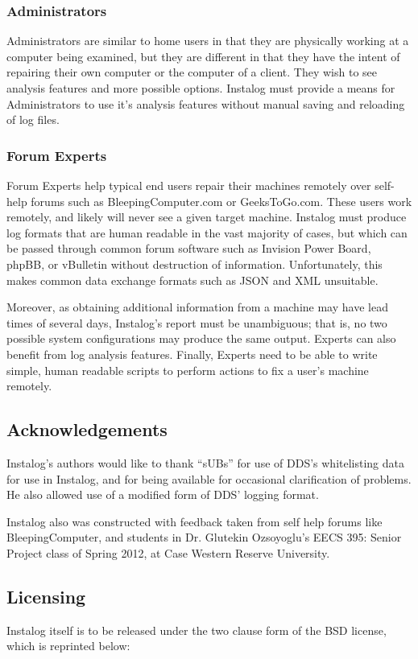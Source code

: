 \subsubsection{Administrators}
Administrators are similar to home users in that they are physically working at
a computer being examined, but they are different in that they have the intent of
repairing their own computer or the computer of a client. They wish to see
analysis features and more possible options. Instalog must provide a means for
Administrators to use it's analysis features without manual saving and reloading
of log files.

\subsubsection{Forum Experts}
Forum Experts help typical end users repair their machines remotely over
self-help forums such as BleepingComputer.com or GeeksToGo.com.
These users work remotely, and likely will never see a given target
machine.
Instalog must produce log formats that are human readable in the vast majority
of cases, but which can be passed through common forum software such as Invision
Power Board, phpBB, or vBulletin without destruction of information.
Unfortunately, this makes common data exchange formats such as JSON and XML
unsuitable. 

Moreover, as obtaining additional information from a machine may
have lead times of several days, Instalog's report must be unambiguous; that is,
no two possible system configurations may produce the same output. Experts can
also benefit from log analysis features. Finally, Experts need to be able to
write simple, human readable scripts to perform actions to fix a user's machine
remotely.

\subsection{Acknowledgements}
Instalog's authors would like to thank ``sUBs'' for use of DDS's whitelisting
data for use in Instalog, and for being available for occasional clarification
of problems. He also allowed use of a modified form of DDS' logging format.

Instalog also was constructed with feedback taken from self help forums like
BleepingComputer, and students in Dr. Glutekin Ozsoyoglu's EECS 395: Senior
Project class of Spring 2012, at Case Western Reserve University.

\subsection{Licensing} \label{sec:licensing}
Instalog itself is to be released under the two clause form of the BSD license,
which is reprinted below:

